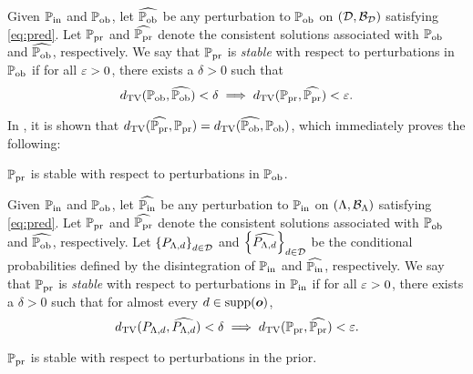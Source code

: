 \begin{frame}[t]

\begin{defn}\label{defn:stableobs}
Given $\operatorname*{\mathbb{P}_{in}}$ and $\operatorname*{\mathbb{P}_{ob}}$, let $\widehat{\operatorname*{\mathbb{P}_{ob}}}$ be any perturbation to $\operatorname*{\mathbb{P}_{ob}}$ on $(\mathcal{D}, \mathcal{B}_{\mathcal{D}})$ satisfying \eqref{eq:pred}.
Let $\operatorname*{\mathbb{P}_{pr}}$ and $\widehat{\operatorname*{\mathbb{P}_{pr}}}$ denote the consistent solutions associated with $\operatorname*{\mathbb{P}_{ob}}$ and $\widehat{\operatorname*{\mathbb{P}_{ob}}}$, respectively.
We say that $\operatorname*{\mathbb{P}_{pr}}$ is \emph{stable} with respect to perturbations in $\operatorname*{\mathbb{P}_{ob}}$ if for all $\varepsilon > 0$, there exists a $\delta > 0$ such that
\begin{equation}
d_{\text{TV}} (\operatorname*{\mathbb{P}_{ob}}, \widehat{\operatorname*{\mathbb{P}_{ob}}}) < \delta \implies d_{\text{TV}} (\operatorname*{\mathbb{P}_{pr}}, \widehat{\operatorname*{\mathbb{P}_{pr}}}) < \varepsilon.
\end{equation}
\end{defn}

In \cite{BJW18}, it is shown that $d_{\text{TV}} (\widehat{\operatorname*{\mathbb{P}_{pr}}}, \operatorname*{\mathbb{P}_{pr}}) = d_{\text{TV}} (\widehat{\operatorname*{\mathbb{P}_{ob}}}, \operatorname*{\mathbb{P}_{ob}})$, which immediately proves the following:

\begin{theorem}
$\operatorname*{\mathbb{P}_{pr}}$ is stable with respect to perturbations in $\operatorname*{\mathbb{P}_{ob}}$.
\end{theorem}

\end{frame}

\begin{frame}[t]
\begin{defn}\label{defn:stableprior}
Given $\operatorname*{\mathbb{P}_{in}}$ and $\operatorname*{\mathbb{P}_{ob}}$, let $\widehat{\operatorname*{\mathbb{P}_{in}}}$ be any perturbation to $\operatorname*{\mathbb{P}_{in}}$ on $({\Lambda}, \mathcal{B}_{{\Lambda}})$ satisfying \eqref{eq:pred}.
Let $\operatorname*{\mathbb{P}_{pr}}$ and $\widehat{\operatorname*{\mathbb{P}_{pr}}}$ denote the consistent solutions associated with $\operatorname*{\mathbb{P}_{ob}}$ and $\widehat{\operatorname*{\mathbb{P}_{ob}}}$, respectively.
Let $\left\{P_{{\Lambda}, d}\right\}_{d\in\mathcal{D}}^{}$ and $\left\{\widehat{P_{{\Lambda}, d}}\right\}_{d\in\mathcal{D}}^{}$ be the conditional probabilities defined by the disintegration of $\operatorname*{\mathbb{P}_{in}}$ and $\widehat{\operatorname*{\mathbb{P}_{in}}}$, respectively.
We say that $\operatorname*{\mathbb{P}_{pr}}$ is \emph{stable} with respect to perturbations in $\operatorname*{\mathbb{P}_{in}}$ if for all $\varepsilon > 0$, there exists a $\delta > 0$ such that for almost every $d\in\text{supp}(\operatorname*{\boldsymbol{o}})$,
\begin{equation}\label{eq:stableprior}
d_{\text{TV}} (P_{{\Lambda}, d}, \widehat{P_{{\Lambda}, d}}) < \delta \implies d_{\text{TV}} (\operatorname*{\mathbb{P}_{pr}}, \widehat{\operatorname*{\mathbb{P}_{pr}}}) < \varepsilon.
\end{equation}
\end{defn}

\begin{theorem}
$\operatorname*{\mathbb{P}_{pr}}$ is stable with respect to perturbations in the prior.
\label{thm:stableprior}
\end{theorem}


\end{frame}

